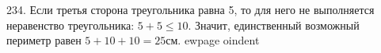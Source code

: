 234. Если третья сторона треугольника равна 5, то для него не выполняется неравенство треугольника: $5+5\leqslant10.$ Значит, единственный возможный периметр равен $5+10+10=25$см.
ewpage
oindent
